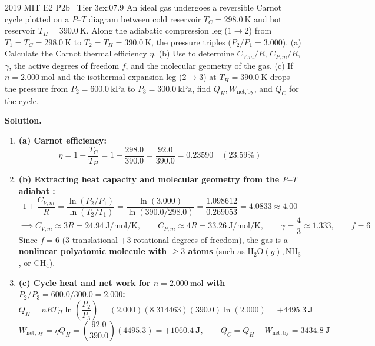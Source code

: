 \begin{workedexample}{2019 MIT E2 P2b \textbar\ Tier 3}{ex:07.9}
An ideal gas undergoes a reversible Carnot cycle plotted on a $P$--$T$ diagram between cold reservoir $T_C = \SI{298.0}{\kelvin}$ and hot reservoir $T_H = \SI{390.0}{\kelvin}$. Along the adiabatic compression leg ($1\to 2$) from $T_1 = T_C = \SI{298.0}{\kelvin}$ to $T_2 = T_H = \SI{390.0}{\kelvin}$, the pressure triples ($P_2/P_1 = 3.000$). (a) Calculate the Carnot thermal efficiency $\eta$. (b) Use  to determine $C_{V,m}/R$, $C_{P,m}/R$, $\gamma$, the active degrees of freedom $f$, and the molecular geometry of the gas. (c) If $n = \SI{2.000}{\mole}$ and the isothermal expansion leg ($2\to 3$) at $T_H = \SI{390.0}{\kelvin}$ drops the pressure from $P_2 = \SI{600.0}{\kilo\pascal}$ to $P_3 = \SI{300.0}{\kilo\pascal}$, find $Q_H, W_{\mathrm{net,by}}$, and $Q_C$ for the cycle.
\par\smallskip\noindent
\textbf{Solution.}
\begin{enumerate}
  \item \textbf{(a) Carnot efficiency:}
  \[
    \eta = 1 - \frac{T_C}{T_H} = 1 - \frac{298.0}{390.0} = \frac{92.0}{390.0} = \mathbf{0.23590} \quad (23.59\%)
  \]
  \item \textbf{(b) Extracting heat capacity and molecular geometry from the $P$--$T$ adiabat :}
  \[
    1 + \frac{C_{V,m}}{R} = \frac{\ln(P_2/P_1)}{\ln(T_2/T_1)} = \frac{\ln(3.000)}{\ln(390.0/298.0)} = \frac{1.098612}{0.269053} = \mathbf{4.0833 \approx 4.00}
  \]
  \[
    \implies \boxed{C_{V,m} \approx 3R = \SI{24.94}{\joule\per\mole\per\kelvin}}, \qquad C_{P,m} \approx 4R = \SI{33.26}{\joule\per\mole\per\kelvin}, \qquad \gamma = \frac{4}{3} \approx 1.333, \qquad f = 6
  \]
  Since $f = 6$ ($3$ translational $+ 3$ rotational degrees of freedom), the gas is a \textbf{nonlinear polyatomic molecule with $\ge 3$ atoms} (such as $\mathrm{H_2O}(g), \mathrm{NH_3}$, or $\mathrm{CH_4}$).
  \item \textbf{(c) Cycle heat and net work for $n = \SI{2.000}{\mole}$ with $P_2/P_3 = 600.0/300.0 = 2.000$:}
  \[
    Q_H = nRT_H\ln\left(\frac{P_2}{P_3}\right) = (2.000)(8.314463)(390.0)\ln(2.000) = \mathbf{+\SI{4495.3}{\joule}}
  \]
  \[
    W_{\mathrm{net,by}} = \eta Q_H = \left(\frac{92.0}{390.0}\right)(4495.3) = \mathbf{+\SI{1060.4}{\joule}}, \qquad Q_C = Q_H - W_{\mathrm{net,by}} = \mathbf{\SI{3434.8}{\joule}}
  \]
\end{enumerate}
\end{workedexample}

